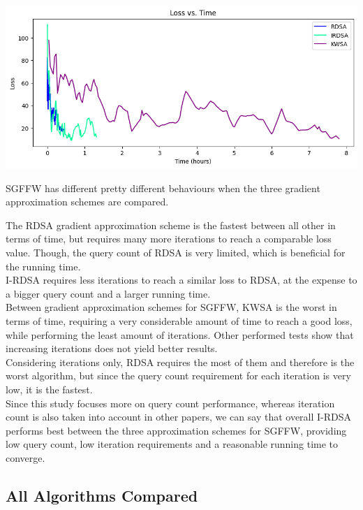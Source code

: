 \documentclass[10pt,twocolumn,letterpaper]{article}
\begin{document}
\begin{center}
   \includegraphics*[scale=0.35]{img/SGFFW_loss_vs_runningtime.png}
\end{center}

SGFFW has different pretty different behaviours when the three gradient approximation schemes
are compared.

The RDSA gradient approximation scheme is the fastest between all other 
in terms of time, but requires many more iterations to reach a comparable loss value.
Though, the query count of RDSA is very limited, which is beneficial for the running time.\\

I-RDSA requires less iterations to reach a similar loss to RDSA, at the expense to a bigger query
count and a larger running time. \\

Between gradient approximation schemes for SGFFW, KWSA is the worst in terms of time, requiring
a very considerable amount of time to reach a good loss, while performing the least amount of iterations.
Other performed tests show that increasing iterations does not yield better results. \\

Considering iterations only, RDSA requires the most of them and therefore is the worst algorithm, 
but since the query count requirement for each iteration is very low, it is the fastest. \\

Since this study focuses more on query count performance, whereas iteration count is also taken into account
in other papers, we can say that overall I-RDSA performs best between the three approximation schemes for SGFFW,
providing low query count, low iteration requirements and a reasonable running time to converge.


\subsection{All Algorithms Compared}
\end{document}
